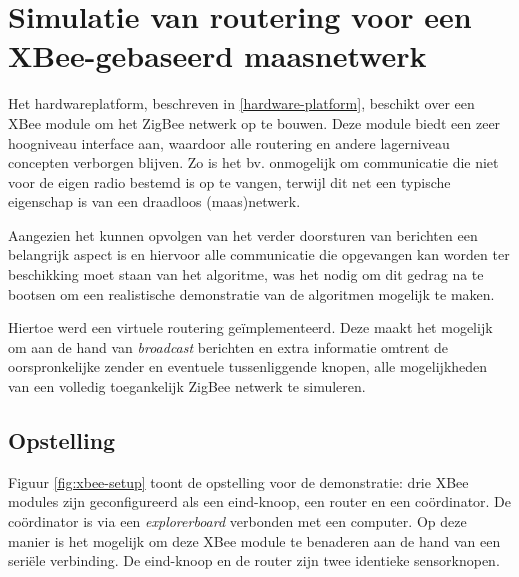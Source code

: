 
\chapter{Simulatie van routering voor een XBee-gebaseerd maasnetwerk}
\label{virtual-mesh}

Het hardwareplatform, beschreven in \ref{hardware-platform}, beschikt over een
XBee module om het ZigBee netwerk op te bouwen. Deze module biedt een zeer
hoogniveau interface aan, waardoor alle routering en andere lagerniveau
concepten verborgen blijven. Zo is het bv. onmogelijk om communicatie die niet
voor de eigen radio bestemd is op te vangen, terwijl dit net een typische
eigenschap is van een draadloos (maas)netwerk.

Aangezien het kunnen opvolgen van het verder doorsturen van berichten een
belangrijk aspect is en hiervoor alle communicatie die opgevangen kan worden
ter beschikking moet staan van het algoritme, was het nodig om dit gedrag na te
bootsen om een realistische demonstratie van de algoritmen mogelijk te maken.

Hiertoe werd een virtuele routering ge\"implementeerd. Deze maakt het mogelijk
om aan de hand van \emph{broadcast} berichten en extra informatie omtrent de
oorspronkelijke zender en eventuele tussenliggende knopen, alle mogelijkheden
van een volledig toegankelijk ZigBee netwerk te simuleren.

\section{Opstelling}

Figuur \ref{fig:xbee-setup} toont de opstelling voor de demonstratie: drie XBee
modules zijn geconfigureerd als een eind-knoop, een router en een
co\"ordinator. De co\"ordinator is via een \emph{explorerboard} verbonden met
een computer. Op deze manier is het mogelijk om deze XBee module te benaderen
aan de hand van een seri\"ele verbinding. De eind-knoop en de router zijn twee
identieke sensorknopen.

